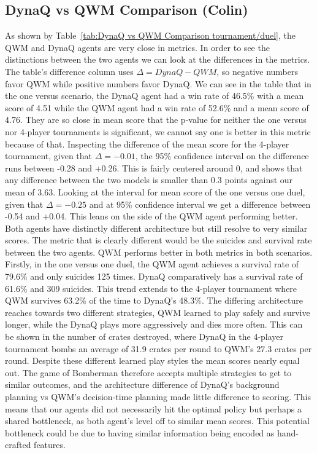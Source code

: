 \documentclass[article, 10pt]{IEEEtran}
\begin{document}
\subsection{DynaQ vs QWM Comparison (Colin)}
As shown by Table~\ref{tab:DynaQ vs QWM Comparison tournament/duel}, the QWM and DynaQ agents are very close in metrics. In order to see the distinctions between the two agents we can look at the differences in the metrics. The table's difference column uses $\Delta = DynaQ - QWM$, so negative numbers favor QWM while positive numbers favor DynaQ. We can see in the table that in the one versus scenario, the DynaQ agent had a win rate of 46.5\% with a mean score of 4.51 while the QWM agent had a win rate of 52.6\% and a mean score of 4.76. They are so close in mean score that the p-value for neither the one versus nor 4-player tournaments is significant, we cannot say one is better in this metric because of that. Inspecting the difference of the mean score for the 4-player tournament, given that $\Delta = -0.01$, the 95\% confidence interval on the difference runs between -0.28 and +0.26. This is fairly centered around 0, and shows that any difference between the two models is smaller than 0.3 points against our mean of 3.63. Looking at the interval for mean score of the one versus one duel, given that $\Delta = -0.25$ and at 95\% confidence interval we get a difference between -0.54 and +0.04. This leans on the side of the QWM agent performing better. Both agents have distinctly different architecture but still resolve to very similar scores. The metric that is clearly different would be the suicides and survival rate between the two agents. QWM performs better in both metrics in both scenarios. Firstly, in the one versus one duel, the QWM agent achieves a survival rate of 79.6\% and only suicides 125 times. DynaQ comparatively has a survival rate of 61.6\% and 309 suicides. This trend extends to the 4-player tournament where QWM survives 63.2\% of the time to DynaQ's 48.3\%. The differing architecture reaches towards two different strategies, QWM learned to play safely and survive longer, while the DynaQ plays more aggressively and dies more often. This can be shown in the number of crates destroyed, where DynaQ in the 4-player tournament bombs an average of 31.9 crates per round to QWM's 27.3 crates per round. Despite these different learned play styles the mean scores nearly equal out. The game of Bomberman therefore accepts multiple strategies to get to similar outcomes, and the architecture difference of DynaQ's background planning vs QWM's decision-time planning made little difference to scoring. This means that our agents did not necessarily hit the optimal policy but perhaps a shared bottleneck, as both agent's level off to similar mean scores. This potential bottleneck could be due to having similar information being encoded as hand-crafted features.
\end{document}
